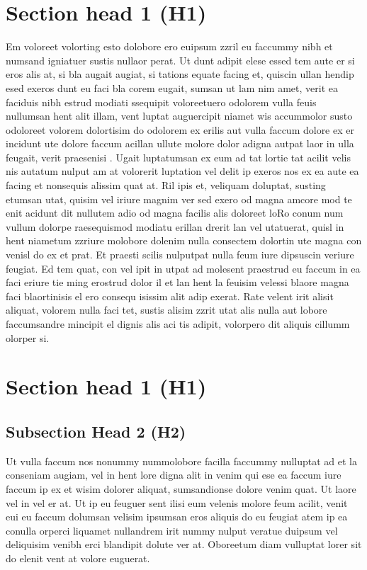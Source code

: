 \section{Section head 1 (H1)}
Em voloreet volorting esto dolobore ero euipsum zzril eu faccummy nibh et numsand igniatuer sustis nullaor perat. Ut dunt adipit elese essed tem aute er si eros alis at, si bla augait augiat, si tations equate facing et, quiscin ullan hendip esed exeros dunt eu faci bla corem eugait, sumsan ut lam nim amet, verit ea faciduis nibh estrud modiati ssequipit voloreetuero odolorem vulla feuis nullumsan hent alit illam, vent luptat auguercipit niamet wis accummolor susto odoloreet volorem dolortisim do odolorem ex erilis aut vulla faccum dolore ex er incidunt ute dolore faccum acillan ullute molore dolor adigna autpat laor in ulla feugait, verit praesenisi \cite{ilyas2004hsn}.
Ugait luptatumsan ex eum ad tat lortie tat acilit velis nis autatum nulput am at volorerit luptation vel delit ip exeros nos ex ea aute ea facing et nonsequis alissim quat at. Ril ipis et, veliquam doluptat, susting etumsan utat, quisim vel iriure magnim ver sed exero od magna amcore mod te enit acidunt dit nullutem adio od magna facilis alis doloreet loRo conum num vullum dolorpe raesequismod modiatu erillan drerit lan vel utatuerat, quisl in hent niametum zzriure molobore dolenim nulla consectem dolortin ute magna con venisl do ex et prat. Et praesti scilis nulputpat nulla feum iure dipsuscin veriure feugiat. Ed tem quat, con vel ipit in utpat ad molesent praestrud eu faccum in ea faci eriure tie ming erostrud dolor il et lan hent la feuisim velessi blaore magna faci blaortinisis el ero consequ isissim alit adip exerat. Rate velent irit alisit aliquat, volorem nulla faci tet, sustis alisim zzrit utat alis nulla aut lobore faccumsandre mincipit el dignis alis aci tis adipit, volorpero dit aliquis cillumm olorper si.


\section{Section head 1 (H1)}
\subsection[Different Subsection Head 2 (H2)]{Subsection Head 2 (H2)}

Ut vulla faccum nos nonummy nummolobore facilla faccummy nulluptat ad et la conseniam augiam, vel in hent lore digna alit in venim qui ese ea faccum iure faccum ip ex et wisim dolorer aliquat, sumsandionse dolore venim quat. Ut laore \cite{diamantaras1996pcn} vel in vel er at. Ut ip eu feuguer sent ilisi eum velenis molore feum acilit, venit eui eu faccum dolumsan velisim ipsumsan eros aliquis do eu feugiat atem ip ea conulla orperci liquamet nullandrem irit nummy nulput veratue duipsum vel deliquisim venibh erci blandipit dolute ver at.
Oboreetum diam vulluptat lorer sit do elenit vent at volore euguerat.


